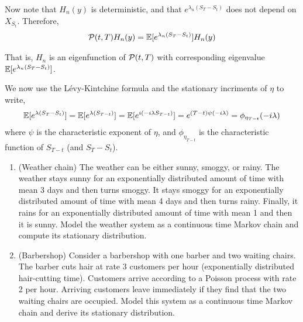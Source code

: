 \begin{solution}[Solution]
    Now note that \( H_n(y) \) is deterministic, and that \( e^{\lambda_n(S_T-S_t)} \) does not depend on \( X_{S_t} \). Therefore,
    \begin{align*}
        \mathcal{P}(t,T)H_n(y) = \mathbb{E}[e^{\lambda_n(S_T-S_t)}]H_n(y)
    \end{align*}

    That is, \( H_n \) is an eigenfunction of \( \mathcal{P}(t,T) \) with corresponding eigenvalue \( \mathbb{E}[e^{\lambda_n(S_T-S_t)}] \).

    We now use the L\'evy-Kintchine formula and the stationary incriments of \( \eta \) to write,
    \begin{align*}
        \mathbb{E}[e^{\lambda(S_T-S_t)}] 
        =\mathbb{E}[e^{\lambda(S_{T-t})}] 
        = \mathbb{E}[e^{i(-i \lambda S_{T-t})}] 
        = e^{(T-t)\psi(-i \lambda)} 
        = \phi_{\eta_{T-t}}(-i \lambda)
    \end{align*}
    where \( \psi \) is the characteristic exponent of \( \eta \), and \( \phi_{\eta_{T-t}} \) is the characteristic function of \( S_{T-t} \) (and \( S_T-S_t \)).
    
    
   
    



\end{solution}


\begin{problem}
\begin{enumerate}[nolistsep,label=(\alph*)]
    \item (Weather chain) The weather can be either sunny, smoggy, or rainy. The weather stays sunny for an exponentially distributed amount of time with mean 3 days and then turns smoggy. It stays smoggy for an exponentially distributed amount of time with mean 4 days and then turns rainy. Finally, it rains for an exponentially distributed amount of time with mean 1 and then it is sunny. Model the weather system as a continuous time Markov chain and compute its stationary distribution.
    \item (Barbershop) Consider a barbershop with one barber and two waiting chairs. The barber cuts hair at rate 3 customers per hour (exponentially distributed hair-cutting time). Customers arrive according to a Poisson process with rate 2 per hour. Arriving customers leave immediately if they find that the two waiting chairs are occupied. Model this system as a continuous time Markov chain and derive its stationary distribution.
\end{enumerate}
\end{problem}

